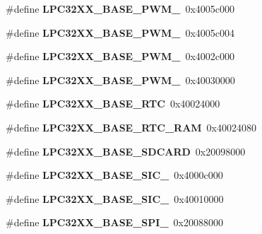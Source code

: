 \begin{DoxyCompactItemize}
\#define {\bfseries L\+P\+C32\+X\+X\+\_\+\+B\+A\+S\+E\+\_\+\+P\+W\+M\+\_}~0x4005c000
\item 
\mbox{\label{group__lpc32xx__reg_ga63d77eb4ae396e83e08ee00b8e9ee645}} 
\#define {\bfseries L\+P\+C32\+X\+X\+\_\+\+B\+A\+S\+E\+\_\+\+P\+W\+M\+\_}~0x4005c004
\item 
\mbox{\label{group__lpc32xx__reg_gac09a78c0ebf473fa0091faf40676c02e}} 
\#define {\bfseries L\+P\+C32\+X\+X\+\_\+\+B\+A\+S\+E\+\_\+\+P\+W\+M\+\_}~0x4002c000
\item 
\mbox{\label{group__lpc32xx__reg_gaae11ece883b0ca426c810563241ed677}} 
\#define {\bfseries L\+P\+C32\+X\+X\+\_\+\+B\+A\+S\+E\+\_\+\+P\+W\+M\+\_}~0x40030000
\item 
\mbox{\label{group__lpc32xx__reg_gad00f8b7e7b132c05d330f989b8249d14}} 
\#define {\bfseries L\+P\+C32\+X\+X\+\_\+\+B\+A\+S\+E\+\_\+\+R\+TC}~0x40024000
\item 
\mbox{\label{group__lpc32xx__reg_ga634fbbaed4f6ce4b69cecc4dea6cccc1}} 
\#define {\bfseries L\+P\+C32\+X\+X\+\_\+\+B\+A\+S\+E\+\_\+\+R\+T\+C\+\_\+\+R\+AM}~0x40024080
\item 
\mbox{\label{group__lpc32xx__reg_ga0aa7aaa3427aaf60e28dfef0003ce6df}} 
\#define {\bfseries L\+P\+C32\+X\+X\+\_\+\+B\+A\+S\+E\+\_\+\+S\+D\+C\+A\+RD}~0x20098000
\item 
\mbox{\label{group__lpc32xx__reg_ga4ca9e220207bcae7ad8ade899d165717}} 
\#define {\bfseries L\+P\+C32\+X\+X\+\_\+\+B\+A\+S\+E\+\_\+\+S\+I\+C\+\_}~0x4000c000
\item 
\mbox{\label{group__lpc32xx__reg_ga18986c6adb09f071c2183f73509486e0}} 
\#define {\bfseries L\+P\+C32\+X\+X\+\_\+\+B\+A\+S\+E\+\_\+\+S\+I\+C\+\_}~0x40010000
\item 
\mbox{\label{group__lpc32xx__reg_gaaf4bb90d13ed51deab65e87b89c54bd4}} 
\#define {\bfseries L\+P\+C32\+X\+X\+\_\+\+B\+A\+S\+E\+\_\+\+S\+P\+I\+\_}~0x20088000
\item 
\mbox{\label{group__lpc32xx__reg_ga7ca4a7adaccb8ee3205ee27f2113b7ff}} 

\end{DoxyCompactItemize}
